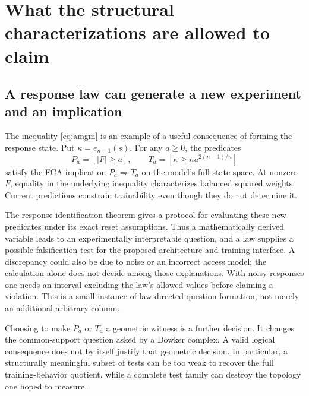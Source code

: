 \documentclass[11pt]{article}
\theoremstyle{definition}\newtheorem{definition}[theorem]{Definition}
\theoremstyle{remark}\newtheorem{remark}[theorem]{Remark}
\begin{document}
\section{What the structural characterizations are allowed to claim}

\subsection{A response law can generate a new experiment and an implication}
The inequality \eqref{eq:amgm} is an example of a useful consequence of
forming the response state. Put $\kappa=e_{n-1}(s)$. For any $a\geq0$, the
predicates
\[
 P_a=[|F|\geq a],\qquad
 T_a=[\kappa\geq n a^{2(n-1)/n}]
\]
satisfy the FCA implication $P_a\Rightarrow T_a$ on the model's full state
space. At nonzero $F$, equality in the underlying inequality characterizes
balanced squared weights. Current predictions constrain trainability even
though they do not determine it.

The response-identification theorem gives a protocol for evaluating these
new predicates under its exact reset assumptions. Thus a mathematically
derived variable leads to an experimentally interpretable question, and a
law supplies a possible falsification test for the proposed architecture
and training interface. A discrepancy could also be due to noise or an
incorrect access model; the calculation alone does not decide among those
explanations. With noisy responses one needs an interval excluding the law's
allowed values before claiming a violation. This is a small instance of
law-directed question formation, not merely an additional arbitrary column.

Choosing to make $P_a$ or $T_a$ a geometric witness is a further decision.
It changes the common-support question asked by a Dowker complex. A valid
logical consequence does not by itself justify that geometric decision.
In particular, a structurally meaningful subset of tests can be too weak
to recover the full training-behavior quotient, while a complete test
family can destroy the topology one hoped to measure.
\end{document}
